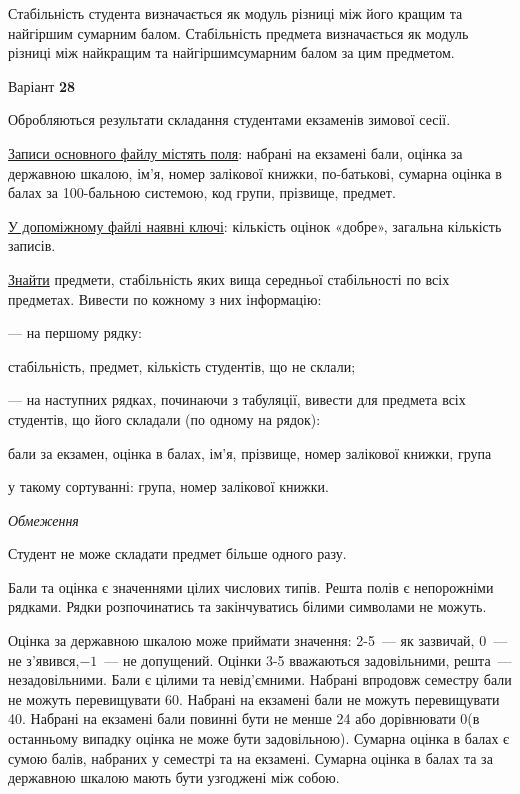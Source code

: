 \documentclass[11pt, ukrainian]{article}
\begin{document}
Стабільність студента визначається як модуль різниці між його кращим та найгіршим сумарним балом.
Стабільність предмета визначається як модуль різниці між найкращим та найгіршимсумарним балом за цим предметом.




\par
\newpage
{\center Варіант  \No \textbf { 28 }\par}
\bigskip
Обробляються результати складання студентами екзаменів зимової сесії.

\underline{Записи основного файлу містять поля}: набрані на екзамені бали, оцінка за державною шкалою, ім’я, номер залікової книжки, по-батькові, сумарна оцінка в балах за 100-бальною системою, код групи, прізвище, предмет.

\underline{У допоміжному файлі наявні ключі}: кількість оцінок «добре», загальна кількість записів.

\underline{Знайти} предмети, стабільність яких вища середньої стабільності по всіх предметах. Вивести по кожному з них інформацію:\par
{\noindent}--- на першому рядку:\par
стабільність, предмет, кількість студентів, що не склали;

{\noindent}--- на наступних рядках, починаючи з табуляції, вивести для предмета всіх студентів, що його складали (по одному на рядок):\par
бали за екзамен, оцінка в балах, ім’я, прізвище, номер залікової книжки, група

{\noindent}у такому сортуванні: група, номер залікової книжки.


\bigskip\textit{Обмеження}

Студент не може складати предмет більше одного разу.

Бали та оцінка є значеннями цілих числових типів. Решта полів є непорожніми рядками.
Рядки розпочинатись та закінчуватись білими символами не можуть.

Оцінка за державною шкалою може приймати значення: 2-5~--- як зазвичай, 0~--- не з’явився,$-1$~--- не допущений. 
Оцінки 3-5 вважаються задовільними, решта~--- незадовільними. 
Бали є цілими та невід’ємними.
Набрані впродовж семестру бали не можуть перевищувати 60. 
Набрані на екзамені бали не можуть перевищувати 40. 
Набрані на екзамені бали повинні бути не менше 24 або дорівнювати 0(в останньому випадку оцінка не може бути задовільною). 
Сумарна оцінка в балах є сумою балів, набраних у семестрі та на екзамені.
Сумарна оцінка в балах та за державною шкалою мають бути узгоджені між собою.
\end{document}
